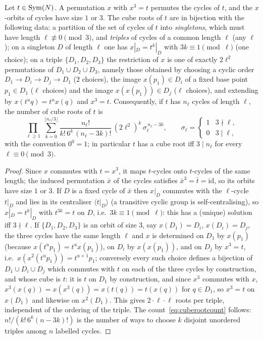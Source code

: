 \documentclass[preprint,12pt]{elsarticle}
\theoremstyle{definition}\newtheorem{defi}[thm]{Definition}\newtheorem{prob}[thm]{Problem}\newtheorem{obs}[thm]{Observation}
\theoremstyle{remark}\newtheorem{rem}[thm]{Remark}
\begin{document}
\begin{lem}\label{lem:cuberoots}
Let $t\in\operatorname{Sym}(N)$. A permutation $x$ with $x^{3}=t$ permutes the cycles of $t$, and the $x$-orbits of cycles have size $1$ or $3$. The cube roots of $t$ are in bijection with the following data:
a partition of the set of cycles of $t$ into \emph{singletons}, which must have length $\ell\not\equiv0\pmod 3$, and \emph{triples} of cycles of a common length $\ell$ (any $\ell$);
on a singleton $D$ of length $\ell$ one has $x|_{D}=t^{k}|_{D}$ with $3k\equiv1\pmod\ell$ (one choice);
on a triple $\{D_1,D_2,D_3\}$ the restriction of $x$ is one of exactly $2\ell^{2}$ permutations of $D_1\cup D_2\cup D_3$, namely those obtained by choosing a cyclic order $D_{1}\to D_{i}\to D_{j}\to D_{1}$ ($2$ choices), the image $x(p_1)\in D_i$ of a fixed base point $p_1\in D_1$ ($\ell$ choices) and the image $x(x(p_1))\in D_j$ ($\ell$ choices), and extending by $x(t^{u}q)=t^{u}x(q)$ and $x^{3}=t$.
Consequently, if $t$ has $n_\ell$ cycles of length $\ell$, the number of cube roots of $t$ is
\begin{equation}\label{eq:cuberootcount}
\prod_{\ell\ge1}\ \sum_{k=0}^{\lfloor n_\ell/3\rfloor}\frac{n_\ell!}{k!\,6^{k}\,(n_\ell-3k)!}\,(2\ell^{2})^{k}\,\sigma_\ell^{\,n_\ell-3k},
\qquad \sigma_\ell=\begin{cases}1&3\nmid\ell,\\0&3\mid\ell,\end{cases}
\end{equation}
with the convention $0^{0}=1$; in particular $t$ has a cube root iff $3\mid n_\ell$ for every $\ell\equiv0\pmod 3$.
\end{lem}
\begin{proof}
Since $x$ commutes with $t=x^{3}$, it maps $t$-cycles onto $t$-cycles of the same length; the induced permutation $\bar x$ of the cycles satisfies $\bar x^{3}=\bar t=\mathrm{id}$, so its orbits have size $1$ or $3$.
If $D$ is a fixed cycle of $\bar x$ then $x|_D$ commutes with the $\ell$-cycle $t|_D$ and lies in its centraliser $\langle t|_D\rangle$ (a transitive cyclic group is self-centralising), so $x|_D=t^{k}|_D$ with $t^{3k}=t$ on $D$, i.e.\ $3k\equiv1\pmod\ell$: this has a (unique) solution iff $3\nmid\ell$.
If $\{D_1,D_2,D_3\}$ is an orbit of size $3$, say $x(D_1)=D_i$, $x(D_i)=D_j$, the three cycles have the same length $\ell$ and $x$ is determined on $D_1$ by $x(p_1)$ (because $x(t^{u}p_1)=t^{u}x(p_1)$), on $D_i$ by $x(x(p_1))$, and on $D_j$ by $x^{3}=t$, i.e.\ $x(x^{2}(t^{u}p_1))=t^{u+1}p_1$; conversely every such choice defines a bijection of $D_1\cup D_i\cup D_j$ which commutes with $t$ on each of the three cycles by construction, and whose cube is $t$: it is $t$ on $D_1$ by construction, and since $x^{3}$ commutes with $x$, $x^{3}(x(q))=x(x^{3}(q))=x(t(q))=t(x(q))$ for $q\in D_1$, so $x^{3}=t$ on $x(D_1)$ and likewise on $x^{2}(D_1)$. This gives $2\cdot\ell\cdot\ell$ roots per triple, independent of the ordering of the triple.
The count~\eqref{eq:cuberootcount} follows: $n!/(k!\,6^{k}(n-3k)!)$ is the number of ways to choose $k$ disjoint unordered triples among $n$ labelled cycles.
\end{proof}
\end{document}
